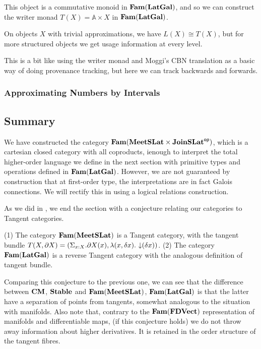 This object is a commutative monoid in $\mathbf{Fam}(\mathbf{LatGal})$, and so we can
construct the writer monad $T(X) = \mathbb{A} \times X$ in
$\mathbf{Fam}(\mathbf{LatGal})$.

On objects $X$ with trivial approximations, we have $L(X) \cong T(X)$,
but for more structured objects we get usage information at every level.

This is a bit like using the writer monad and Moggi's CBN translation
as a basic way of doing provenance tracking, but here we can track
backwards and forwards.

\subsubsection{Approximating Numbers by Intervals}


\subsection{Summary}

We have constructed the category
$\mathbf{Fam}(\mathbf{MeetSLat} \times \mathbf{JoinSLat}^{\mathsf{op}})$, which is a cartesian closed
category with all coproducts, ienough to interpret the total
higher-order language we define in the next section with primitive
types and operations defined in $\mathbf{Fam}(\mathbf{LatGal})$. However, we are not
guaranteed by construction that at first-order type, the
interpretations are in fact Galois connections. We will rectify this
in  using a logical relations construction.

As we did in , we end the section with a
conjecture relating our categories to Tangent categories.

\begin{conjecture}
  (1) The category $\mathbf{Fam}(\mathbf{MeetSLat})$ is a Tangent category, with the
  tangent bundle
  $T(X, \partial X) = (\Sigma_{x : X}. \partial X(x), \lambda (x,
  \delta x).\, \mathop{\downarrow}(\delta x))$. (2) The category $\mathbf{Fam}(\mathbf{LatGal})$
  is a reverse Tangent category with the analogous definition of
  tangent bundle.
\end{conjecture}

Comparing this conjecture to the previous one, we can see that the
difference between $\mathbf{CM}$, $\mathbf{Stable}$ and $\mathbf{Fam}(\mathbf{MeetSLat})$,
$\mathbf{Fam}(\mathbf{LatGal})$ is that the latter have a separation of points from
tangents, somewhat analogous to the situation with manifolds. Also
note that, contrary to the $\mathbf{Fam}(\mathbf{FDVect})$ representation of
manifolds and differentiable maps, (if this conjecture holds) we do
not throw away information about higher derivatives. It is retained in
the order structure of the tangent fibres.
